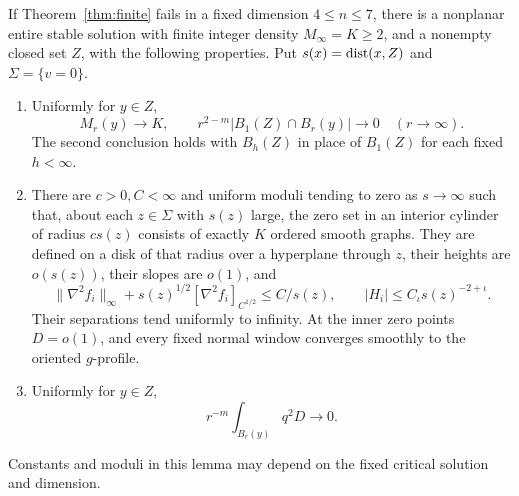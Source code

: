 \begin{lemma}\label{lem:finite-critical}
If Theorem~\ref{thm:finite} fails in a fixed dimension \(4\le n\le7\),
there is a nonplanar entire stable solution with finite integer density
\(M_\infty=K\ge2\), and a nonempty closed set \(Z\), with the following
properties.  Put \(s(x)=\operatorname{dist}(x,Z)\) and \(\Sigma=\{v=0\}\).
\begin{enumerate}[label=\textup{(\roman*)}]
\item Uniformly for \(y\in Z\),
\[
 M_r(y)\longrightarrow K,\qquad
 r^{2-m}|B_1(Z)\cap B_r(y)|\longrightarrow0
 \quad(r\to\infty).
\]
The second conclusion holds with \(B_h(Z)\) in place of \(B_1(Z)\)
for each fixed \(h<\infty\).
\item There are \(c>0,C<\infty\) and uniform moduli tending to zero
as \(s\to\infty\) such that, about each \(z\in\Sigma\) with \(s(z)\)
large, the zero set in an interior cylinder of radius \(c s(z)\)
consists of exactly \(K\) ordered smooth graphs.  They are defined on
a disk of that radius over a hyperplane through \(z\), their heights
are \(o(s(z))\), their slopes are \(o(1)\), and
\[
 \|\nabla^2 f_i\|_\infty+
 s(z)^{1/2}[\nabla^2 f_i]_{C^{1/2}}\le C/s(z),
 \qquad |H_i|\le C_\iota s(z)^{-2+\iota}.
\]
Their separations tend uniformly to infinity.  At the inner zero
points \(D=o(1)\), and every fixed normal window converges smoothly
to the oriented \(g\)-profile.
\item Uniformly for \(y\in Z\),
\begin{equation}\label{eq:finite-discrepancy}
 r^{-m}\int_{B_r(y)}q^2D\longrightarrow0.
\end{equation}
\end{enumerate}
Constants and moduli in this lemma may depend on the fixed critical
solution and dimension.
\end{lemma}

